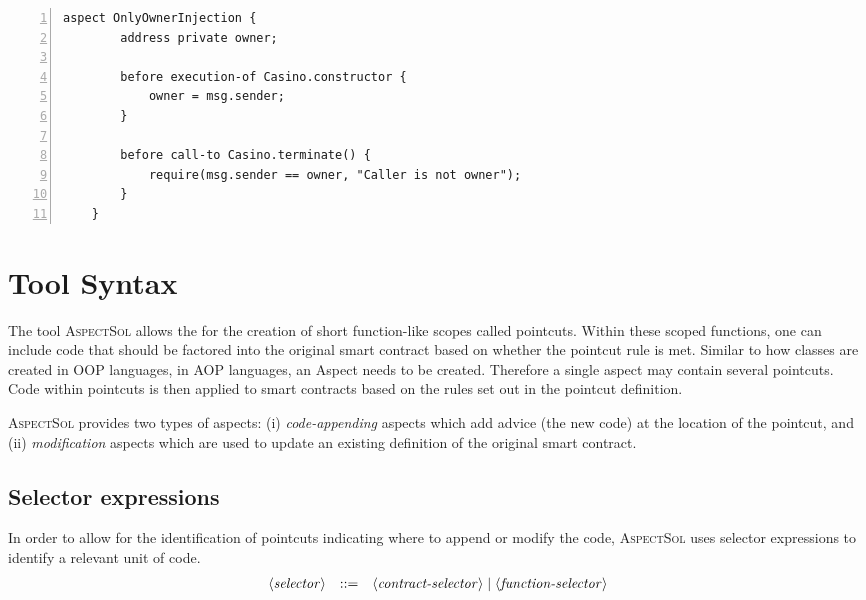 \documentclass{article}
\newcommand{\AspectSol}{\textsc{AspectSol}\xspace}
\newcommand{\variable}[1]{\ensuremath{\langle\textrm{\textit{#1}}\rangle}}
\begin{document}
\small\begin{lstlisting}[language=Solidity,numbers=left,numbersep=2pt,xleftmargin=0.3cm,label={code:aspectSolExample}, caption={\AspectSol Script Example.}]
	aspect OnlyOwnerInjection {
		address private owner;
		
		before execution-of Casino.constructor {
			owner = msg.sender;
		}
		
		before call-to Casino.terminate() {
			require(msg.sender == owner, "Caller is not owner");
		}
	}
\end{lstlisting}\normalsize
	

\section{Tool Syntax}
\label{toolSyntax}

The tool \AspectSol allows the for the creation of short function-like scopes called pointcuts. Within these scoped functions, one can include code that should be factored into the original smart contract based on whether the pointcut rule is met. Similar to how classes are created in OOP languages, in AOP languages, an Aspect needs to be created. Therefore a single aspect may contain several pointcuts. Code within pointcuts is then applied to smart contracts based on the rules set out in the pointcut definition.

\AspectSol provides two types of aspects: (i) \emph{code-appending} aspects which add advice (the new code) at the location of the pointcut, and (ii) \emph{modification} aspects which are used to update an existing definition of the original smart contract.

\subsection{Selector expressions}
\label{s:selectors}

In order to allow for the identification of pointcuts indicating where to append or modify the code, \AspectSol uses selector expressions to identify a relevant unit of code.
\[\begin{array}{lcl}
\variable{selector} & ::= &  \variable{contract-selector} \mid \variable{function-selector}
\end{array}\]
\end{document}
